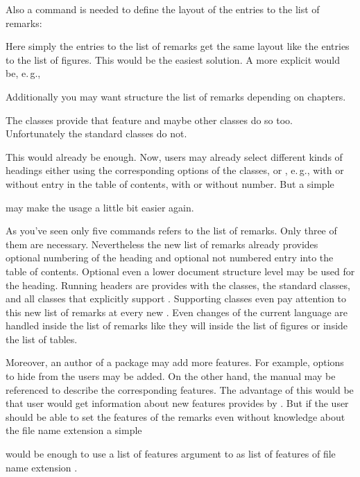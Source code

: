 Also a command is needed to define the layout of the entries
to the list of remarks:
\begin{lstcode}
  \newcommand*{\l@remarkbox}{\l@figure}
\end{lstcode}
Here simply the entries to the list of remarks get the same layout like the
entries to the list of figures. This would be the easiest solution. A more
explicit would be, e.\,g.,
\begin{lstcode}
\end{lstcode}

Additionally you may want structure the list of
remarks depending on chapters.
\begin{lstcode}
\end{lstcode}
The \KOMAScript{} classes provide that feature and maybe other classes do so
too. Unfortunately the standard classes do not.

This would already be enough. Now, users may already
select different kinds of headings either using the corresponding options of
the \KOMAScript{} classes, or , e.\,g., with
or without entry in the table of contents, with or without number. But a
simple
\begin{lstcode}
  \newcommand*{\listofremarkboxes}{\listoftoc{lor}}
\end{lstcode}
may make the usage a little bit easier again.

As you've seen only five commands refers to the list of remarks. Only three of
them are necessary. Nevertheless the new list of remarks already provides
optional numbering of the heading and optional not numbered entry into the
table of contents. Optional even a lower document structure level may be used
for the heading. Running headers are provides with the \KOMAScript{} classes,
the standard classes, and all classes that explicitly support
. Supporting classes even pay attention to this new list of
remarks at every new . Even changes of the
current language are handled inside the list of remarks like they will inside
the list of figures or inside the list of tables.

Moreover, an author of a package may add more
features. For example, options to hide  from
the users may be added. On the other hand, the  manual may
be referenced to describe the corresponding features. The advantage of this
would be that user would get information about new features provides by
. But if the user should be able to set the features of the
remarks even without knowledge about the file name extension  a
simple
\begin{lstcode}
  \newcommand*{\setupremarkboxes}{\setuptoc{lor}}
\end{lstcode}
would be enough to use a list of features argument to
 as list of features of file name extension .

